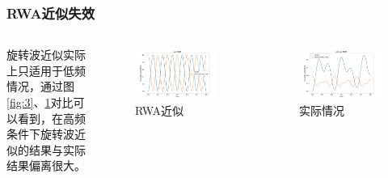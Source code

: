 \documentclass[aspectratio=169, 12pt]{beamer}
\begin{document}
\begin{frame}
    \frametitle{RWA近似失效}
    \begin{columns}
    旋转波近似实际上只适用于低频情况，通过图\ref{fig:3}、\ref{fig:4}对比可以看到，在高频条件下旋转波近似的结果与实际结果偏离很大。
    \begin{figure}
        \centering
        \includegraphics[width=1.0\linewidth]{4.png}
        \caption{RWA近似}
        \label{fig:4}
    \end{figure}
    \begin{figure}
        \centering
        \includegraphics[width=1.0\linewidth]{5.png}
        \caption{实际情况}
        \label{fig:5}
    \end{figure}
    \end{columns}
\end{frame}
\end{document}
